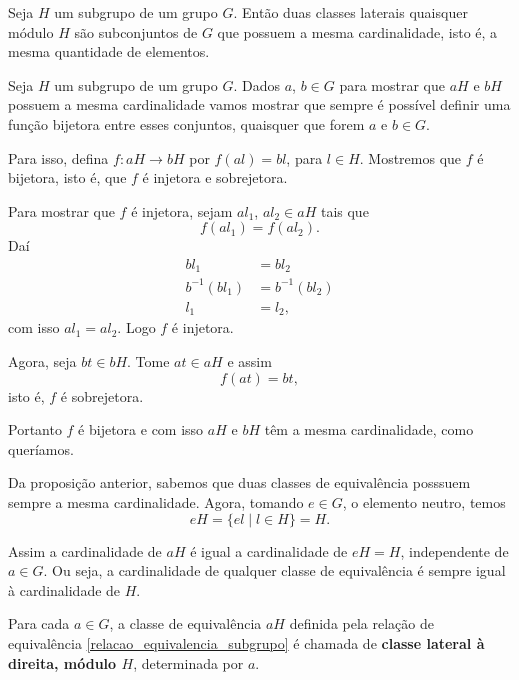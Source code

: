 \begin{proposicao}
    Seja $H$ um subgrupo de um grupo $G$. Ent\~ao duas classes laterais quaisquer m\'odulo $H$ s\~ao subconjuntos de $G$ que possuem a mesma cardinalidade, isto \'e, a mesma quantidade de elementos.
\end{proposicao}
\begin{prova}
	Seja $H$ um subgrupo de um grupo $G$. Dados $a$, $b \in G$ para mostrar que $aH$ e $bH$ possuem a mesma cardinalidade vamos mostrar que sempre é possível definir uma função bijetora entre esses conjuntos, quaisquer que forem $a$ e $b \in G$.

	Para isso, defina $f : aH \to bH$ por $f(al) = bl$, para $l \in H$. Mostremos que $f$ é bijetora, isto é, que $f$ é injetora e sobrejetora.

	Para mostrar que $f$ é injetora, sejam $al_1$, $al_2 \in aH$ tais que
	\[
		f(al_1) = f(al_2).
	\]
	Daí
	\begin{align*}
		bl_1 &= bl_2\\
		b^{-1}(bl_1) &= b^{-1}(bl_2)\\
		l_1 &= l_2,
	\end{align*}
	com isso $al_1 = al_2$. Logo $f$ é injetora.

	Agora, seja $bt \in bH$. Tome $at \in aH$ e assim
	\[
		f(at) = bt,
	\]
	isto é, $f$ é sobrejetora.

	Portanto $f$ é bijetora e com isso $aH$ e $bH$ têm a mesma cardinalidade, como queríamos.
\end{prova}

\begin{observacao}
	Da proposição anterior, sabemos que duas classes de equivalência posssuem sempre a mesma cardinalidade. Agora, tomando $e \in G$, o elemento neutro, temos
	\[
		eH = \{el \mid l \in H\} = H.
	\]

	Assim a cardinalidade de $aH$ é igual a cardinalidade de $eH = H$, independente de $a \in G$. Ou seja, a cardinalidade de qualquer classe de equivalência é sempre igual à cardinalidade de $H$.
\end{observacao}

\begin{definicao}
	Para cada $a \in G$, a classe de equivalência $aH$ definida pela relação de equivalência \eqref{relacao_equivalencia_subgrupo} é chamada de \textbf{classe lateral à direita, módulo $H$}, determinada por $a$.
\end{definicao}

